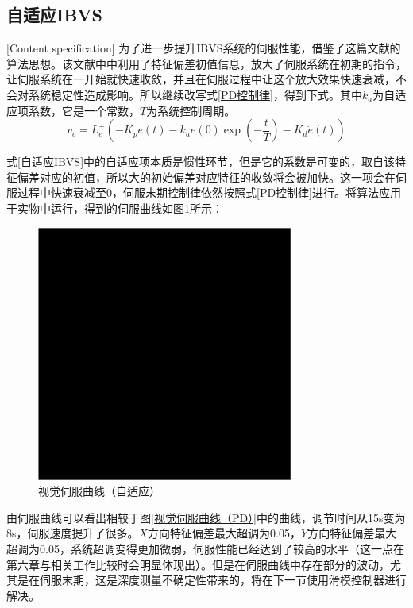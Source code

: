 \documentclass[fontset=fandol,type=bachelor,campus=harbin,bsmainpagenumberline=true]{hithesisbook}
\begin{document}
\subsection{自适应IBVS}[Content specification]
为了进一步提升IBVS系统的伺服性能，借鉴了这篇文献的算法思想\cite{mansard2007task}。该文献中中利用了特征偏差初值信息，放大了伺服系统在初期的指令，让伺服系统在一开始就快速收敛，并且在伺服过程中让这个放大效果快速衰减，不会对系统稳定性造成影响。所以继续改写式\ref{PD控制律}，得到下式。其中$k_a$为自适应项系数，它是一个常数，$T$为系统控制周期。
\begin{equation}
v_c=L_{e}^{+}\left( -K_pe\left( t \right) -k_ae\left( 0 \right) \exp \left( -\frac{t}{T} \right) -K_d\dot{e}\left( t \right) \right)  
\label{自适应IBVS}
\end{equation}


式\ref{自适应IBVS}中的自适应项本质是惯性环节，但是它的系数是可变的，取自该特征偏差对应的初值，所以大的初始偏差对应特征的收敛将会被加快。这一项会在伺服过程中快速衰减至0，伺服末期控制律依然按照式\ref{PD控制律}进行。将算法应用于实物中运行，得到的伺服曲线如图\ref{视觉伺服曲线（自适应）}所示：
\begin{figure}[h]
	\centering
	\includegraphics[width=0.75\textwidth]{chapter5/替身}
	\caption{视觉伺服曲线（自适应）}
	\label{视觉伺服曲线（自适应）}
\end{figure}


由伺服曲线可以看出相较于图\ref{视觉伺服曲线（PD）}中的曲线，调节时间从15s变为8s，伺服速度提升了很多。$X$方向特征偏差最大超调为0.05，$Y$方向特征偏差最大超调为0.05，系统超调变得更加微弱，伺服性能已经达到了较高的水平（这一点在第六章与相关工作比较时会明显体现出）。但是在伺服曲线中存在部分的波动，尤其是在伺服末期，这是深度测量不确定性带来的，将在下一节使用滑模控制器进行解决。
\end{document}
